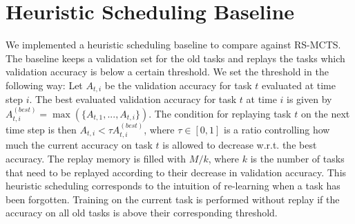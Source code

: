 
\section{Heuristic Scheduling Baseline}\label{app:heuristic_scheduling_baseline}

We implemented a heuristic scheduling baseline to compare against RS-MCTS. The baseline keeps a validation set for the old tasks and replays the tasks which validation accuracy is below a certain threshold. We set the threshold in the following way: Let $A_{t, i}$ be the validation accuracy for task $t$ evaluated at time step $i$. The best evaluated validation accuracy for task $t$ at time $i$ is given by $A_{t, i}^{(best)} = \max(\{A_{t, 1}, ..., A_{t, i} \})$. The condition for replaying task $t$ on the next time step is then $A_{t, i} < \tau A_{t, i}^{(best)}$, where $\tau \in [0, 1]$ is a ratio controlling how much the current accuracy on task $t$ is allowed to decrease w.r.t. the best accuracy. The replay memory is filled with $M/k$, where $k$ is the number of tasks that need to be replayed according to their decrease in validation accuracy. This heuristic scheduling corresponds to the intuition of re-learning when a task has been forgotten. Training on the current task is performed without replay if the accuracy on all old tasks is above their corresponding threshold.       


